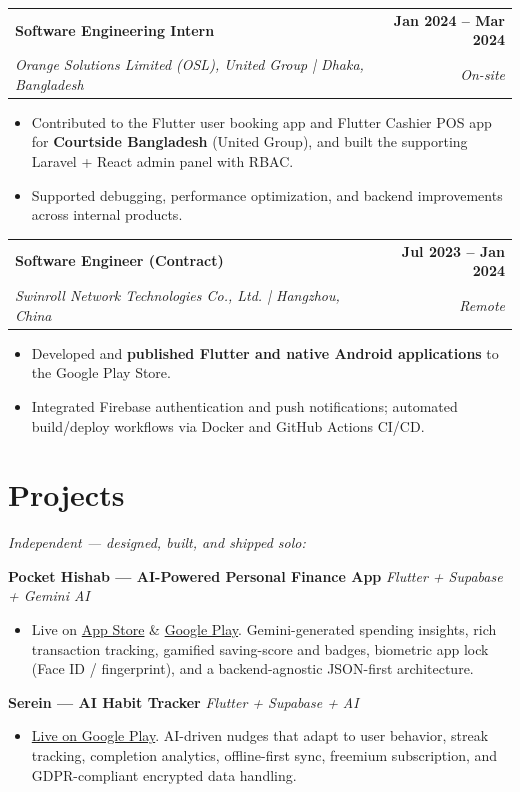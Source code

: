 \documentclass[a4paper,10pt]{article}
\makeatletter
\newcommand{\smallgap}{\vspace{1pt}}
\newcommand{\medgap}{\vspace{3pt}}
\newcommand{\entry}[4]{
  \begin{tabularx}{\textwidth}{@{}X r@{}}
    \textbf{#1} & \textbf{#2} \\
    \textit{#3} & \textit{#4} \\
  \end{tabularx}
}
\newcommand{\project}[2]{%
  \smallgap
  \noindent\textbf{#1} \hfill \textit{#2}\par
}
\makeatother
\begin{document}
\smallgap

\entry{Software Engineering Intern}{Jan 2024 -- Mar 2024}{Orange Solutions Limited (OSL), United Group | Dhaka, Bangladesh}{On-site}
\begin{itemize}
  \item Contributed to the Flutter user booking app and Flutter Cashier POS app for \textbf{Courtside Bangladesh} (United Group), and built the supporting Laravel + React admin panel with RBAC.
  \item Supported debugging, performance optimization, and backend improvements across internal products.
\end{itemize}

\smallgap

\entry{Software Engineer (Contract)}{Jul 2023 -- Jan 2024}{Swinroll Network Technologies Co., Ltd. | Hangzhou, China}{Remote}
\begin{itemize}
  \item Developed and \textbf{published Flutter and native Android applications} to the Google Play Store.
  \item Integrated Firebase authentication and push notifications; automated build/deploy workflows via Docker and GitHub Actions CI/CD.
\end{itemize}

\medgap

\section*{Projects}

\textit{Independent --- designed, built, and shipped solo:}
\smallgap

\project{Pocket Hishab --- AI-Powered Personal Finance App}{Flutter + Supabase + Gemini AI}
\begin{itemize}
  \item Live on \href{https://apps.apple.com/us/app/pocket-hishab/id6759366572}{App Store} \& \href{https://play.google.com/store/apps/details?id=com.mtrs.pocket_hishab}{Google Play}. Gemini-generated spending insights, rich transaction tracking, gamified saving-score and badges, biometric app lock (Face ID / fingerprint), and a backend-agnostic JSON-first architecture.
\end{itemize}

\project{Serein --- AI Habit Tracker}{Flutter + Supabase + AI}
\begin{itemize}
  \item \href{https://play.google.com/store/apps/details?id=com.mtrs.habit_ai}{Live on Google Play}. AI-driven nudges that adapt to user behavior, streak tracking, completion analytics, offline-first sync, freemium subscription, and GDPR-compliant encrypted data handling.
\end{itemize}
\end{document}
